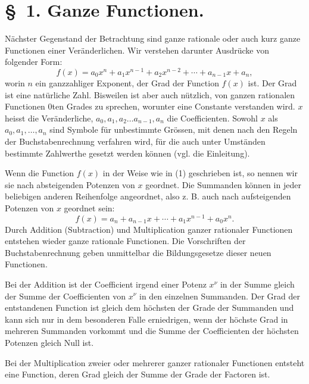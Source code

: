 \documentclass[11pt]{article}
\begin{document}
\section*{\S~1. Ganze Functionen.}

Nächster Gegenstand der Betrachtung sind ganze rationale oder auch kurz ganze Functionen einer Veränderlichen. Wir verstehen darunter Ausdrücke von folgender Form:
\begin{equation}
 f(x)=a_0x^n+a_1x^{n-1}+a_2x^{n-2}+\cdots+a_{n-1}x+a_n,
\tag{1}
\end{equation}
worin $n$ ein ganzzahliger Exponent, der Grad der Function $f(x)$ ist. Der Grad ist eine natürliche Zahl. Bisweilen ist aber auch nützlich, von ganzen rationalen Functionen $0$ten Grades zu sprechen, worunter eine Constante verstanden wird. $x$ heisst die Veränderliche, $a_0,a_1,a_2\ldots a_{n-1},a_n$ die Coefficienten. Sowohl $x$ als $a_0,a_1,\ldots,a_n$ sind Symbole für unbestimmte Grössen, mit denen nach den Regeln der Buchstabenrechnung verfahren wird, für die auch unter Umständen bestimmte Zahlwerthe gesetzt werden können (vgl. die Einleitung).

Wenn die Function $f(x)$ in der Weise wie in (1) geschrieben ist, so nennen wir sie nach absteigenden Potenzen von $x$ geordnet. Die Summanden können in jeder beliebigen anderen Reihenfolge angeordnet, also z. B. auch nach aufsteigenden Potenzen von $x$ geordnet sein:
\[
 f(x)=a_n+a_{n-1}x+\cdots+a_1x^{n-1}+a_0x^n.
\]
Durch Addition (Subtraction) und Multiplication ganzer rationaler Functionen entstehen wieder ganze rationale Functionen. Die Vorschriften der Buchstabenrechnung geben unmittelbar die Bildungsgesetze dieser neuen Functionen.

Bei der Addition ist der Coefficient irgend einer Potenz $x^\nu$ in der Summe gleich der Summe der Coefficienten von $x^\nu$ in den einzelnen Summanden. Der Grad der entstandenen Function ist gleich dem höchsten der Grade der Summanden und kann sich nur in dem besonderen Falle erniedrigen, wenn der höchste Grad in mehreren Summanden vorkommt und die Summe der Coefficienten der höchsten Potenzen gleich Null ist.

Bei der Multiplication zweier oder mehrerer ganzer rationaler Functionen entsteht eine Function, deren Grad gleich der Summe der Grade der Factoren ist.
\end{document}
